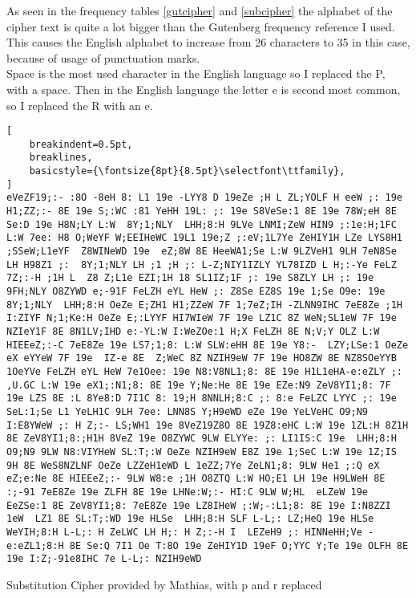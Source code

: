 \documentclass{uva-inf-bachelor-thesis}
\begin{document}
As seen in the frequency tables \ref{gutcipher} and \ref{subcipher} the alphabet of the cipher text is quite a lot
bigger than the Gutenberg frequency reference I used. This causes the English
alphabet to increase from 26 characters to 35 in this case, because of usage of
punctuation marks.\\
Space is the most used character in the English language so I replaced the P,
with a space. Then in the English language the letter e is second most common,
so I replaced the R with an e.

\begin{lstlisting}[
    breakindent=0.5pt,
    breaklines,
    basicstyle={\fontsize{8pt}{8.5pt}\selectfont\ttfamily},
]
eVeZF19;:- :8O -8eH 8: L1 19e -LYY8 D 19eZe ;H L ZL;YOLF H eeW ;: 19e H1;ZZ;:- 8E 19e S;:WC :81 YeHH 19L: ;: 19e S8VeSe:1 8E 19e 78W;eH 8E Se:D 19e H8N;LY L:W  8Y;1;NLY  LHH;8:H 9LVe LNMI;ZeW HIN9 ;:1e:H;1FC L:W 7ee: H8 O;WeYF W;EEIHeWC 19L1 19e;Z ;:eV;1L7Ye ZeHIY1H LZe LYS8H1 ;SSeW;L1eYF  Z8WINeWD 19e  eZ;8W 8E HeeWA1;Se L:W 9LZVeH1 9LH 7eN8Se LH H98Z1 ;:  8Y;1;NLY LH ;1 ;H ;: L-Z;NIY1IZLY YL78IZD L H;:-Ye FeLZ 7Z;:-H ;1H L  Z8 Z;L1e EZI;1H 18 SL1IZ;1F ;: 19e S8ZLY LH ;: 19e  9FH;NLY O8ZYWD e;-91F FeLZH eYL HeW ;: Z8Se EZ8S 19e 1;Se O9e: 19e  8Y;1;NLY  LHH;8:H OeZe E;ZH1 H1;ZZeW 7F 1;7eZ;IH -ZLNN9IHC 7eE8Ze ;1H I:ZIYF N;1;Ke:H OeZe E;:LYYF HI7WIeW 7F 19e LZ1C 8Z WeN;SL1eW 7F 19e NZIeY1F 8E 8N1LV;IHD e:-YL:W I:WeZOe:1 H;X FeLZH 8E N;V;Y OLZ L:W HIEEeZ;:-C 7eE8Ze 19e LS7;1;8: L:W SLW:eHH 8E 19e Y8:-  LZY;LSe:1 OeZe eX eYYeW 7F 19e  IZ-e 8E  Z;WeC 8Z NZIH9eW 7F 19e HO8ZW 8E NZ8SOeYYB 1OeYVe FeLZH eYL HeW 7e1Oee: 19e N8:V8NL1;8: 8E 19e H1L1eHA-e:eZLY ;: ,U.GC L:W 19e eX1;:N1;8: 8E 19e Y;Ne:He 8E 19e EZe:N9 ZeV8YI1;8: 7F 19e LZS 8E :L 8Ye8:D 7I1C 8: 19;H 8NNLH;8:C ;: 8:e FeLZC LYYC ;: 19e SeL:1;Se L1 YeLH1C 9LH 7ee: LNN8S Y;H9eWD eZe 19e YeLVeHC O9;N9 I:E8YWeW ;: H Z;:- LS;WH1 19e 8VeZ19Z8O 8E 19Z8:eHC L:W 19e 1ZL:H 8Z1H 8E ZeV8YI1;8:;H1H 8VeZ 19e O8ZYWC 9LW ELYYe: ;: LI1IS:C 19e  LHH;8:H O9;N9 9LW N8:VIYHeW SL:T;:W OeZe NZIH9eW E8Z 19e 1;SeC L:W 19e 1Z;IS 9H 8E WeS8NZLNF OeZe LZZeH1eWD L 1eZZ;7Ye ZeLN1;8: 9LW He1 ;:Q eX eZ;e:Ne 8E HIEEeZ;:- 9LW W8:e ;1H O8ZTQ L:W HO;E1 LH 19e H9LWeH 8E :;-91 7eE8Ze 19e ZLFH 8E 19e LHNe:W;:- HI:C 9LW W;HL  eLZeW 19e EeZSe:1 8E ZeV8YI1;8: 7eE8Ze 19e LZ8IHeW ;:W;-:L1;8: 8E 19e I:N8ZZI 1eW  LZ1 8E SL:T;:WD 19e HLSe  LHH;8:H SLF L-L;: LZ;HeQ 19e HLSe WeYIH;8:H L-L;: H ZeLWC LH H;: H Z;:-H I  LEZeH9 ;: HINNeHH;Ve -e:eZL1;8:H 8E Se:Q 7I1 Oe T:8O 19e ZeHIY1D 19eF O;YYC Y;Te 19e OLFH 8E 19e I:Z;-91e8IHC 7e L-L;: NZIH9eWD
\end{lstlisting}
\caption[lstlisting]{Substitution Cipher provided by Mathias, with p and r
replaced}
\vspace{20pt}
\end{document}

